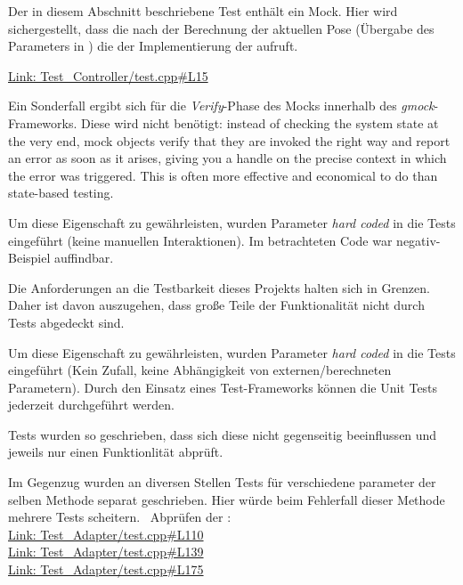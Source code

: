 \clearpage
{}
Der in diesem Abschnitt beschriebene Test enthält ein Mock.
Hier wird sichergestellt, dass die  nach der Berechnung der aktuellen Pose (Übergabe des Parameters in ) die  der Implementierung der  aufruft.

\href{https://github.com/MobMonRob/ROSLabDrohne/blob/9edc7b5814c1bb731abf0f7af4352289e57b681f/Code/Test\_Controller/test.cpp\#L15}{Link: Test\_Controller/test.cpp\#L15}

Ein Sonderfall ergibt sich für die \textit{Verify}-Phase des Mocks innerhalb des \textit{gmock}-Frameworks. Diese wird nicht benötigt:
\glqq instead of checking the system state at the very end, mock objects verify that they are invoked the right way and report an error as soon as it arises, giving you a handle on the precise context in which the error was triggered. This is often more effective and economical to do than state-based testing.\grqq \cite{gmockFAQ}


Um diese Eigenschaft zu gewährleisten, wurden Parameter \textit{hard coded} in die Tests eingeführt (keine manuellen Interaktionen).
Im betrachteten Code war negativ-Beispiel auffindbar.


Die Anforderungen an die Testbarkeit dieses Projekts halten sich in Grenzen. Daher ist davon auszugehen, dass große Teile der Funktionalität nicht durch Tests abgedeckt sind.\\


Um diese Eigenschaft zu gewährleisten, wurden Parameter \textit{hard coded} in die Tests eingeführt (Kein Zufall, keine Abhängigkeit von externen/berechneten Parametern).
Durch den Einsatz eines Test-Frameworks können die Unit Tests jederzeit durchgeführt werden.


Tests wurden so geschrieben, dass sich diese nicht gegenseitig beeinflussen und jeweils nur einen Funktionlität abprüft.

Im Gegenzug wurden an diversen Stellen Tests für verschiedene parameter der selben Methode separat geschrieben. Hier würde beim Fehlerfall dieser Methode mehrere Tests scheitern.
\zB\ Abprüfen der :\\
\href{https://github.com/MobMonRob/ROSLabDrohne/blob/9edc7b5814c1bb731abf0f7af4352289e57b681f/Code/Test\_Adapter/test.cpp\#L110}{Link: Test\_Adapter/test.cpp\#L110}\\
\href{https://github.com/MobMonRob/ROSLabDrohne/blob/9edc7b5814c1bb731abf0f7af4352289e57b681f/Code/Test\_Adapter/test.cpp\#L139}{Link: Test\_Adapter/test.cpp\#L139}\\
\href{https://github.com/MobMonRob/ROSLabDrohne/blob/9edc7b5814c1bb731abf0f7af4352289e57b681f/Code/Test\_Adapter/test.cpp\#L175}{Link: Test\_Adapter/test.cpp\#L175}


